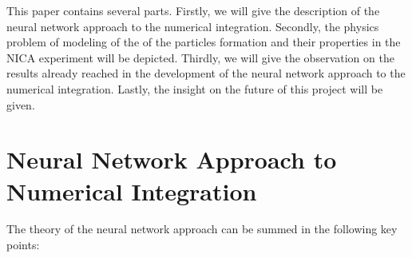 \documentclass[%
]{ittmm}
\begin{document}
This paper contains several parts. Firstly, we will give the description of the neural network approach to the numerical integration. Secondly, the physics problem of modeling of the of the particles formation and their properties in the NICA experiment will be depicted. Thirdly, we will give the observation on the results already reached in the development of the neural network approach to the numerical integration. Lastly, the insight on the future of this project will be given. 

\section{Neural Network Approach to Numerical Integration}

The theory of the neural network approach can be summed in the following key points:
\end{document}
